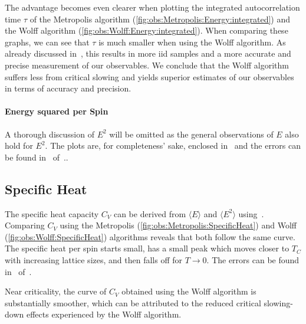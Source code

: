 		The advantage becomes even clearer when plotting the integrated autocorrelation time $\tau$ of the Metropolis algorithm (\cref{fig:obs:Metropolis:Energy:integrated}) and the Wolff algorithm (\cref{fig:obs:Wolff:Energy:integrated}). When comparing these graphs, we can see that $\tau$ is much smaller when using the Wolff algorithm. As already discussed in~, this results in more iid samples and a more accurate and precise measurement of our observables. We conclude that the Wolff algorithm suffers less from critical slowing and yields superior estimates of our observables in terms of accuracy and precision.
	
	\paragraph{Energy squared per Spin}\label{sec:res:energysquare} A thorough discussion of $E^2$ will be omitted as the general observations of $E$ also hold for $E^2$. The plots are, for completeness' sake, enclosed in~ and the errors can be found in~ of~..
	
	\subsection{Specific Heat}\label{sec:res:cv:observable}
		The specific heat capacity $C_V$ can be derived from $\langle E \rangle$ and $\langle E^2 \rangle$  using~. Comparing $C_V$ using the Metropolis (\cref{fig:obs:Metropolis:SpecificHeat}) and Wolff (\cref{fig:obs:Wolff:SpecificHeat}) algorithms reveals that both follow the same curve. The specific heat per spin starts small, has a small peak which moves closer to $T_C$ with increasing lattice sizes, and then falls off for $T\rightarrow 0$. The errors can be found in~ of~.
		
		Near criticality, the curve of $C_V$ obtained using the Wolff algorithm is substantially smoother, which can be attributed to the reduced critical slowing-down effects experienced by the Wolff algorithm.
	
